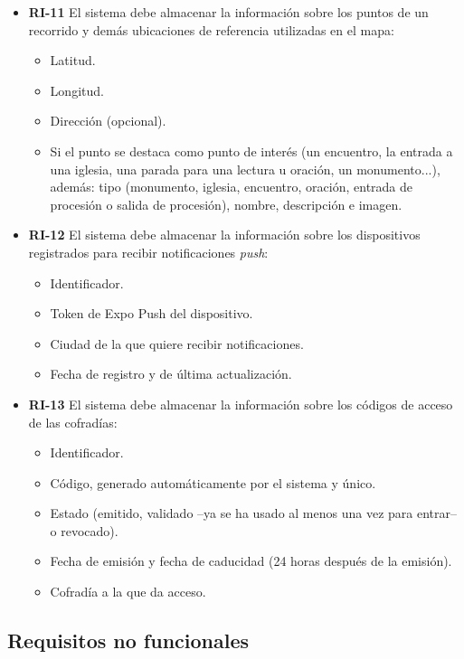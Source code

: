 \begin{itemize}
    \item \textbf{RI-11}  El sistema debe almacenar la información sobre los puntos de un recorrido y demás ubicaciones de referencia utilizadas en el mapa:
    \begin{itemize}
        \item Latitud.
        \item Longitud.
        \item Dirección (opcional).
        \item Si el punto se destaca como punto de interés (un encuentro, la entrada a una iglesia, una parada para una lectura u oración, un monumento...), además: tipo (monumento, iglesia, encuentro, oración, entrada de procesión o salida de procesión), nombre, descripción e imagen.
    \end{itemize}

    \item \textbf{RI-12}  El sistema debe almacenar la información sobre los dispositivos registrados para recibir notificaciones \emph{push}:
    \begin{itemize}
        \item Identificador.
        \item Token de Expo Push del dispositivo.
        \item Ciudad de la que quiere recibir notificaciones.
        \item Fecha de registro y de última actualización.
    \end{itemize}

    \item \textbf{RI-13}  El sistema debe almacenar la información sobre los códigos de acceso de las cofradías:
    \begin{itemize}
        \item Identificador.
        \item Código, generado automáticamente por el sistema y único.
        \item Estado (emitido, validado --ya se ha usado al menos una vez para entrar-- o revocado).
        \item Fecha de emisión y fecha de caducidad (24 horas después de la emisión).
        \item Cofradía a la que da acceso.
    \end{itemize}

\end{itemize}

\subsection{Requisitos no funcionales}

